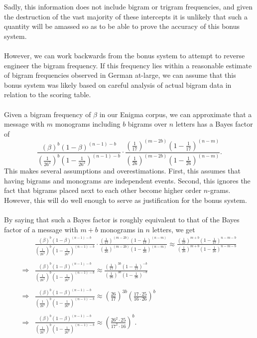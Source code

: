 Sadly, this information does not include bigram or trigram
frequencies, and given the destruction of the vast majority of
these intercepts it
is unlikely that such a quantity will be amassed so as to be able
to prove the accuracy of this bonus system.
\\\\However, we can work backwards from the bonus system to attempt
to reverse engineer the bigram frequency. If this frequency lies
within a reasonable estimate of bigram frequencies observed in
German at-large, we can assume that this bonus system was likely
based on careful analysis of actual bigram data in relation to the
scoring table.
\\\\Given a bigram frequency of $\beta$ in our Enigma corpus, we
can approximate that a message with $m$ monograms including $b$
bigrams over $n$ letters has a Bayes factor of
\[
  \frac{(\beta)^b(1-\beta)^{(n-1)-b}}{(\frac{1}{26^2})^b(1-\frac{1}{26^2})^{(n-1)-b}}\cdot\frac{(\frac{1}{17})^{(m-2b)}(1-\frac{1}{17})^{(n-m)}}{(\frac{1}{26})^{(m-2b)}(1-\frac{1}{26})^{(n-m)}}.
\]
This makes several assumptions and overestimations. First, this
assumes that having bigrams and monograms are independent events.
Second, this ignores the fact that bigrams placed next to each
other become higher order $n$-grams. However, this will do well
enough to serve as justification for the bonus system.
\\\\By saying that such a Bayes factor is roughly equivalent to
that of the Bayes factor of a message with $m+b$ monograms in $n$
letters, we get
\begin{align*}
  &
  \frac{(\beta)^b(1-\beta)^{(n-1)-b}}{(\frac{1}{26^2})^b(1-\frac{1}{26^2})^{(n-1)-b}}\cdot\frac{(\frac{1}{17})^{(m-2b)}(1-\frac{1}{17})^{(n-m)}}{(\frac{1}{26})^{(m-2b)}(1-\frac{1}{26})^{(n-m)}}
  \approx
  \frac{(\frac{1}{17})^{m+b}(1-\frac{1}{17})^{n-m-b}}{(\frac{1}{26})^{m+b}(1-\frac{1}{26})^{n-m-b}}
  \\\\
  \Rightarrow &
  \frac{(\beta)^b(1-\beta)^{(n-1)-b}}{(\frac{1}{26^2})^b(1-\frac{1}{26^2})^{(n-1)-b}}\approx
  \frac{(\frac{1}{17})^{3b}(1-\frac{1}{17})^{-b}}{(\frac{1}{26})^{3b}(1-\frac{1}{26})^{-b}}
  \\\\
  \Rightarrow &
  \frac{(\beta)^b(1-\beta)^{(n-1)-b}}{(\frac{1}{26^2})^b(1-\frac{1}{26^2})^{(n-1)-b}}\approx
  (\frac{26}{17})^{3b}(\frac{17\cdot25}{16\cdot26})^b
  \\\\
  \Rightarrow &
  \frac{(\beta)^b(1-\beta)^{(n-1)-b}}{(\frac{1}{26^2})^b(1-\frac{1}{26^2})^{(n-1)-b}}\approx
  (\frac{26^2\cdot25}{17^2\cdot16})^b.
\end{align*}

